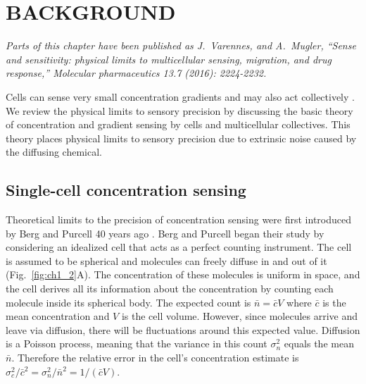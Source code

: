 
\chapter{BACKGROUND}

\textit{Parts of this chapter have been published as J.\ Varennes, and A.\ Mugler, ``Sense and sensitivity: physical limits to multicellular sensing, migration, and drug response,'' Molecular pharmaceutics 13.7 (2016): 2224-2232.}
\vspace{5mm}

Cells can sense very small concentration gradients \cite{shields2007autologous} and may also act collectively
\cite{cheung2013collective, friedl2012classifying, aceto2014circulating, puliafito2015three}.
We review the physical limits to sensory precision by discussing the basic theory of concentration and gradient sensing by cells and multicellular collectives. This theory places physical limits to sensory precision due to extrinsic noise caused by the diffusing chemical.

\section{Single-cell concentration sensing}

Theoretical limits to the precision of concentration sensing were first introduced by Berg and Purcell 40 years ago \cite{berg1977physics}. Berg and Purcell began their study by considering an idealized cell that acts as a perfect counting instrument. The cell is assumed to be spherical and molecules can freely diffuse in and out of it (Fig.\ \ref{fig:ch1_2}A). The concentration of these molecules is uniform in space, and the cell derives all its information about the concentration by counting each molecule inside its spherical body. The expected count is
$\bar{n} = \bar{c}V$ where $\bar{c}$
is the mean concentration and $V$ is the cell volume. However, since molecules arrive and leave via diffusion, there will be fluctuations around this expected value. Diffusion is a Poisson process, meaning that the variance in this count $\sigma_n^2$ equals the mean $\bar{n}$. Therefore the relative error in the cell's concentration estimate is
$\sigma^2_c/\bar{c}^2 = \sigma_n^2/\bar{n}^2 = 1/(\bar{c} V)$.

